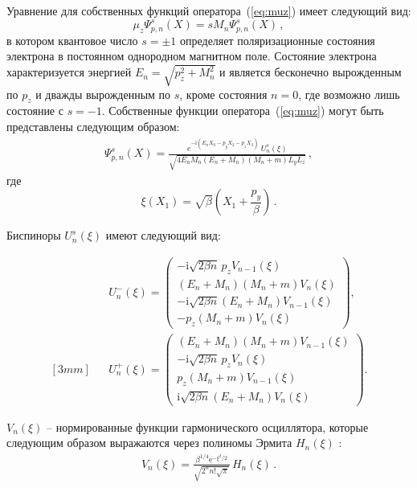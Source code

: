 \documentclass[cp1251%
               ]{jetp} %
\def\beq{\begin{eqnarray}}
\def\eeq{\end{eqnarray}}
\newcommand{\ii}{\mathrm{i}} %
\newcommand{\eee}{\mathrm{e}} %
\begin{document}
Уравнение для собственных функций оператора~(\ref{eq:muz}) имеет следующий вид:
\begin{equation}
	{\mu}_z \Psi^s_{p,n}(X)=s M_n \Psi^s_{p,n}(X)\, ,
\end{equation}
в котором квантовое число $s=\pm 1$ определяет поляризационные состояния электрона в постоянном однородном магнитном поле. 
Состояние электрона характеризуется энергией $E_n = \sqrt{p_z^2+M_n^2}$ и является бесконечно вырожденным по $p_z$ и дважды вырожденным по $s$, кроме состояния 
$n=0$, где возможно лишь состояние с $s=-1$. Собственные функции оператора~(\ref{eq:muz}) могут быть представлены следующим образом:
\begin{eqnarray}
\label{eq:psie}
\Psi^s_{p,n}(X) = \frac{e^{-\ii(E_{n} X_0 - p_y X_2 - p_z X_3)}\; U^s_{n} (\xi)}
{\sqrt{4E_{n}M_n (E_{n} + M_n)(M_n + m) L_y L_z}} \, ,  
\end{eqnarray}
где 
\begin{equation}
	\xi(X_1)=\sqrt{\beta}\left(X_1+ \frac{p_y}{\beta}\right)\, .
\end{equation}

Биспиноры  $U^s_{n} (\xi)$ имеют следующий вид:

\beq
\label{eq:U--}
&&U^{-}_{n} (\xi) = \left ( 
\begin{array}{c}
	-\ii\sqrt{2\beta n} \, p_z V_{n-1} (\xi)\\[2mm]
	(E_n + M_n)(M_n + m) V_n (\xi)\\[2mm]
	-\ii\sqrt{2\beta n} (E_n + M_n) V_{n-1} (\xi)\\[2mm]
	-p_z (M_n + m) V_n (\xi)
\end{array}
\right )  ,   
%
\\ [3mm]
\label{eq:U+-}
&&U^{+}_{n} (\xi) = \left ( 
\begin{array}{c}
	(E_n + M_n) (M_n + m) V_{n-1} (\xi)\\[2mm]
	-\ii\sqrt{2\beta n} \, p_z V_n (\xi)\\[2mm]
	p_z (M_n + m) V_{n-1} (\xi)\\[2mm]
	\ii \sqrt{2 \beta n} (E_n + M_n) V_n (\xi)
\end{array}
\right )\! .
\eeq

$V_n(\xi)$ -- нормированные функции гармонического осциллятора, которые 
следующим образом выражаются через полиномы Эрмита $H_n(\xi)$ \cite{Gradstein:1963}:
%
\begin{eqnarray}
\label{eq:V_n}
V_n (\xi) = \frac{\beta^{1/4}\eee^{-\xi^2/2}}{\sqrt{2^n n! \sqrt{\pi}}} \, H_n(\xi)\, .
\end{eqnarray}
\end{document}
